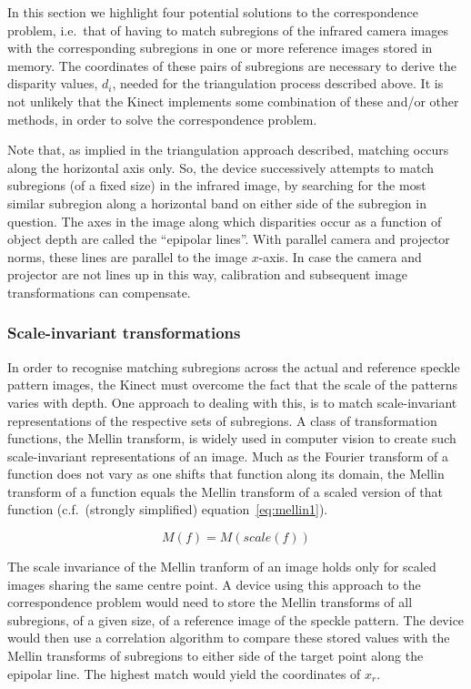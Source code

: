 In this section we highlight four potential solutions to the correspondence
problem, i.e.\ that of having to match subregions of the infrared camera images
with the corresponding subregions in one or more reference images stored in
memory. The coordinates of these pairs of subregions are necessary to derive
the disparity values, $d_i$, needed for the triangulation process described
above.  It is not unlikely that the Kinect implements some combination of these
and/or other methods, in order to solve the correspondence problem.

Note that, as implied in the triangulation approach described, matching occurs
along the horizontal axis only. So, the device successively attempts to match
subregions (of a fixed size) in the infrared image, by searching for the most
similar subregion along a horizontal band on either side of the subregion in
question. The axes in the image along which disparities occur as a function of
object depth are called the ``epipolar lines''. With parallel camera and
projector norms, these lines are parallel to the image $x$-axis. In case the
camera and projector are not lines up in this way, calibration and subsequent
image transformations can compensate.


\subsubsection{Scale-invariant transformations}
In order to recognise matching subregions across the actual and reference
speckle pattern images, the Kinect must overcome the fact that the scale of the
patterns varies with depth. One approach to dealing with this, is to match
scale-invariant representations of the respective sets of subregions. A class of
transformation functions, the Mellin transform, is widely used in computer
vision to create such scale-invariant representations of an image. Much as the
Fourier transform of a function does not vary as one shifts that function along
its domain, the Mellin transform of a function equals the Mellin transform of a
scaled version of that function (c.f.\ (strongly simplified)
equation~\ref{eq:mellin1}).

\begin{equation} \label{eq:mellin1}
    M (f) = M(scale(f))
\end{equation}

The scale invariance of the Mellin tranform of an image holds only for scaled
images sharing the same centre point. A device using this approach to the
correspondence problem would need to store the Mellin transforms of all
subregions, of a given size, of a reference image of the speckle pattern. The
device would then use a correlation algorithm to compare these stored values
with the Mellin transforms of subregions to either side of the target point
along the epipolar line. The highest match would yield the coordinates of $x_r$.


